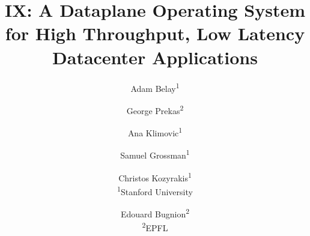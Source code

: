 \documentclass[10pt,twocolumn]{article}
\begin{document}
\title{\bf IX: A Dataplane Operating System for High Throughput,\break
  Low Latency Datacenter Applications}


\author{Adam Belay\textsuperscript{1} \and 
  George Prekas\textsuperscript{2} \and 
  Ana Klimovic\textsuperscript{1} \and 
  Samuel Grossman\textsuperscript{1} \and
  Christos Kozyrakis\textsuperscript{1}\vspace*{5pt}\\\textsuperscript{1}Stanford
  University \and
  Edouard Bugnion\textsuperscript{2}\vspace*{5pt}\\\textsuperscript{2}EPFL}

 

\date{}
\maketitle


\pagestyle{empty}

\thispagestyle{fancy}














 
\end{document}
